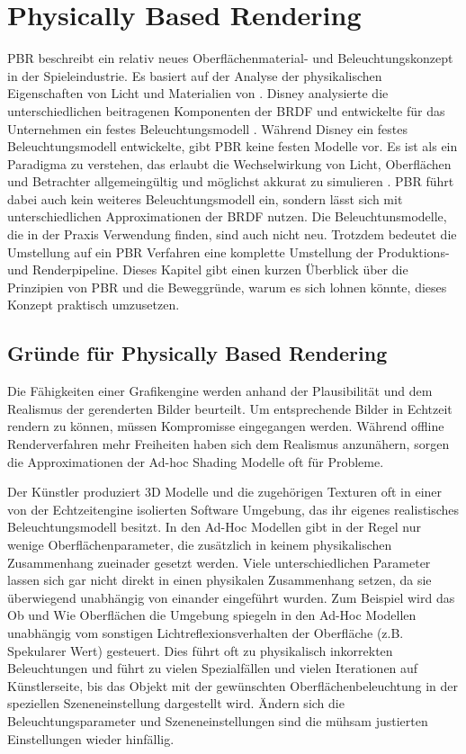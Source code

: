 \chapter{Physically Based Rendering}
\label{chap:pbr}

\acl{PBR} beschreibt ein relativ neues Oberflächenmaterial- und Beleuchtungskonzept in der Spieleindustrie. Es basiert auf der Analyse der physikalischen Eigenschaften von Licht und Materialien von \cite{Gotanda}. Disney analysierte die unterschiedlichen beitragenen Komponenten der \ac{BRDF} und entwickelte für das Unternehmen ein festes Beleuchtungsmodell \parencite{Burley2012}. Während Disney ein festes Beleuchtungsmodell entwickelte, gibt \ac{PBR} keine festen Modelle vor. Es ist als ein Paradigma zu verstehen, das erlaubt die Wechselwirkung von Licht, Oberflächen und Betrachter allgemeingültig und möglichst akkurat zu simulieren \parencite[Kapitel 1]{Rousiers2014}. \ac{PBR} führt dabei auch kein weiteres Beleuchtungsmodell ein, sondern lässt sich mit unterschiedlichen Approximationen der BRDF nutzen. Die Beleuchtunsmodelle, die in der Praxis Verwendung finden, sind auch nicht neu. Trotzdem bedeutet die Umstellung auf ein \ac{PBR} Verfahren eine komplette Umstellung der Produktions- und Renderpipeline. Dieses Kapitel gibt einen kurzen Überblick über die Prinzipien von \ac{PBR} und die Beweggründe, warum es sich lohnen könnte, dieses Konzept praktisch umzusetzen.

\section{Gründe für Physically Based Rendering}
\label{sec:pbr-warum}

Die Fähigkeiten einer Grafikengine werden anhand der Plausibilität und dem Realismus der gerenderten Bilder beurteilt. Um entsprechende Bilder in Echtzeit rendern zu können, müssen Kompromisse eingegangen werden. Während offline Renderverfahren mehr Freiheiten haben sich dem Realismus anzunähern, sorgen die Approximationen der Ad-hoc Shading Modelle \parencite{Martinez2010} oft für Probleme.

Der Künstler produziert 3D Modelle und die zugehörigen Texturen oft in einer von der Echtzeitengine isolierten Software Umgebung, das ihr eigenes realistisches Beleuchtungsmodell besitzt. In den Ad-Hoc Modellen gibt in der Regel nur wenige Oberflächenparameter, die zusätzlich in keinem physikalischen Zusammenhang zueinader gesetzt werden. Viele unterschiedlichen Parameter lassen sich gar nicht direkt in einen physikalen Zusammenhang setzen, da sie überwiegend unabhängig von einander eingeführt wurden. Zum Beispiel wird das Ob und Wie Oberflächen die Umgebung spiegeln in den Ad-Hoc Modellen unabhängig vom sonstigen Lichtreflexionsverhalten der Oberfläche (z.B. Spekularer Wert) gesteuert. Dies führt oft zu physikalisch inkorrekten Beleuchtungen und führt zu vielen Spezialfällen und vielen Iterationen auf Künstlerseite, bis das Objekt mit der gewünschten Oberflächenbeleuchtung in der speziellen Szeneneinstellung dargestellt wird. Ändern sich die Beleuchtungsparameter und Szeneneinstellungen sind die mühsam justierten Einstellungen wieder hinfällig.

